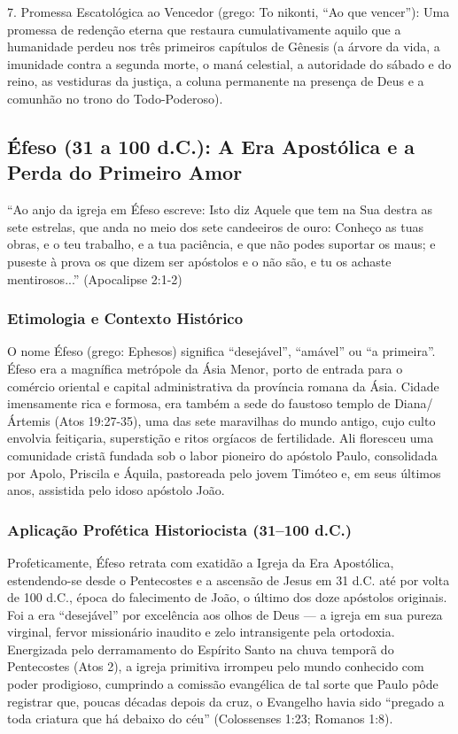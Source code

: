 7. Promessa Escatológica ao Vencedor (grego: To nikonti, ``Ao que vencer''): Uma promessa de redenção eterna que restaura cumulativamente aquilo que a humanidade perdeu nos três primeiros capítulos de Gênesis (a árvore da vida, a imunidade contra a segunda morte, o maná celestial, a autoridade do sábado e do reino, as vestiduras da justiça, a coluna permanente na presença de Deus e a comunhão no trono do Todo-Poderoso).



\subsection{Éfeso (31 a 100 d.C.): A Era Apostólica e a Perda do Primeiro Amor}


``Ao anjo da igreja em Éfeso escreve: Isto diz Aquele que tem na Sua destra as sete estrelas, que anda no meio dos sete candeeiros de ouro: Conheço as tuas obras, e o teu trabalho, e a tua paciência, e que não podes suportar os maus; e puseste à prova os que dizem ser apóstolos e o não são, e tu os achaste mentirosos...'' (Apocalipse 2:1-2)


\subsubsection*{Etimologia e Contexto Histórico}
O nome Éfeso (grego: Ephesos) significa ``desejável'', ``amável'' ou ``a primeira''. Éfeso era a magnífica metrópole da Ásia Menor, porto de entrada para o comércio oriental e capital administrativa da província romana da Ásia. Cidade imensamente rica e formosa, era também a sede do faustoso templo de Diana/Ártemis (Atos 19:27-35), uma das sete maravilhas do mundo antigo, cujo culto envolvia feitiçaria, superstição e ritos orgíacos de fertilidade. Ali floresceu uma comunidade cristã fundada sob o labor pioneiro do apóstolo Paulo, consolidada por Apolo, Priscila e Áquila, pastoreada pelo jovem Timóteo e, em seus últimos anos, assistida pelo idoso apóstolo João.


\subsubsection*{Aplicação Profética Historiocista (31–100 d.C.)}
Profeticamente, Éfeso retrata com exatidão a Igreja da Era Apostólica, estendendo-se desde o Pentecostes e a ascensão de Jesus em 31 d.C. até por volta de 100 d.C., época do falecimento de João, o último dos doze apóstolos originais. Foi a era ``desejável'' por excelência aos olhos de Deus — a igreja em sua pureza virginal, fervor missionário inaudito e zelo intransigente pela ortodoxia. Energizada pelo derramamento do Espírito Santo na chuva temporã do Pentecostes (Atos 2), a igreja primitiva irrompeu pelo mundo conhecido com poder prodigioso, cumprindo a comissão evangélica de tal sorte que Paulo pôde registrar que, poucas décadas depois da cruz, o Evangelho havia sido ``pregado a toda criatura que há debaixo do céu'' (Colossenses 1:23; Romanos 1:8).


